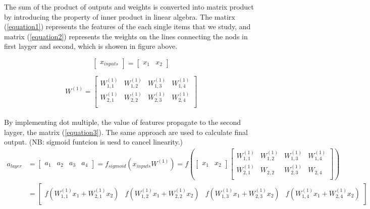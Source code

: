 \documentclass{article}
\begin{document}
\begin{spacing}{2}
    \noindent The sum of the product of outputs and weights is converted into matrix product by introducing the property of inner product in linear algebra. The matirx (\ref{equation1}) represents the features of the each single items that we study, and matrix (\ref{equation2}) represents the weights on the lines connecting the nods in first layger and second, which is showen in figure above.

    \begin{equation}\label{equation1}
        {\left[ \begin{array}{c}
            x_{inputs}
            \end{array}\right]}=
        {\left[ \begin{array}{cc}
        x_1 & x_2
        \end{array}\right]}
    \end{equation}

    \begin{equation}\label{equation2}
        W^{(1)}=
        {\left[ \begin{array}{cccc}
        W^{(1)}_{1,1} & W^{(1)}_{1,2} & W^{(1)}_{1,3} & W^{(1)}_{1,4}\\
        W^{(1)}_{2,1} & W^{(1)}_{2,2} & W^{(1)}_{2,3} & W^{(1)}_{2,4}\\
        \end{array}\right]}
    \end{equation}\\

    \noindent By implementing dot multiple, the value of features propagate to the second layger, the matrix (\ref{equation3}). The same approach are used to calculate final output. (NB: sigmoid funtcion is uesd to cancel linearity.)
        \begin{align}\label{equation3}
        a_{layer}&=
        {\left[ \begin{array}{cccc}
       a_1&a_2&a_3&a_4
        \end{array}\right]}
        =f_{sigmoid}(x_{inputs}W^{(1)})
        =f(
        {\left[ \begin{array}{cc}
            x_1 & x_2
        \end{array}\right]}
        {\left[ \begin{array}{cccc}
            W^{(1)}_{1,1} & W^{(1)}_{1,2} & W^{(1)}_{1,3} & W^{(1)}_{1,4}\\
            W^{(1)}_{2,1} & W_{2,2} & W^{(1)}_{2,3} & W_{2,4}\\
        \end{array}\right]})\nonumber\\
        &=
        {\left[ \begin{array}{ccccc}
            f(W^{(1)}_{1,1}x_1+W^{(1)}_{2,1}x_2) & f(W^{(1)}_{1,2}x_1+W^{(1)}_{2,2}x_2) &f(W^{(1)}_{1,3}x_1+W^{(1)}_{2,3}x_2) &f(W^{(1)}_{1,4}x_1+W^{(1)}_{2,4}x_2)
        \end{array}\right]}
    \end{align}  


\end{spacing}
\end{document}
